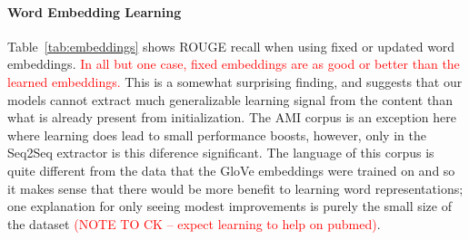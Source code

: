 




\paragraph{Word Embedding Learning}{

Table~\ref{tab:embeddings} shows ROUGE recall
when using fixed or updated word embeddings. 
\textcolor{red}{In all but one case,
fixed embeddings are as good or better than the learned embeddings.}
This is a somewhat surprising finding, and suggests that our models
cannot extract much generalizable learning signal from the content than what 
is already present from initialization. 
The AMI corpus is an exception here where learning does lead to small
performance boosts, however, only in the Seq2Seq extractor is this diference 
significant. The language of this corpus is quite different from the 
data that the GloVe embeddings were trained on and so it makes sense 
that  there would be more benefit to learning word representations; one
explanation for only seeing modest improvements is purely the small size
of the dataset \textcolor{red}{(NOTE TO CK -- expect learning to help on pubmed)}. 


}


